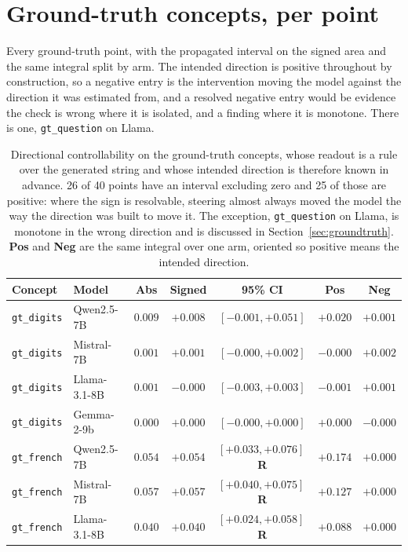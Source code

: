 \documentclass{article}
\begin{document}
\section{Ground-truth concepts, per point}
\label{app:groundtruth}

Every ground-truth point, with the propagated interval on the signed area
and the same integral split by arm. The intended direction is positive
throughout by construction, so a negative entry is the intervention moving
the model against the direction it was estimated from, and a resolved
negative entry would be evidence the check is wrong where it is isolated, and
a finding where it is monotone. There is one, \texttt{gt\_question} on Llama.

\begin{table}[htbp]
  \caption{Directional controllability on the ground-truth concepts,
  whose readout is a rule over the generated string and whose intended
  direction is therefore known in advance. 26 of 40 points have an interval
  excluding zero and 25 of those are positive: where the sign is resolvable,
  steering almost always moved the model the way the direction was built to move
  it. The exception, \texttt{gt\_question} on Llama, is monotone in the wrong
  direction and is discussed in Section~\ref{sec:groundtruth}. \textbf{Pos} and \textbf{Neg} are the same integral over one arm,
  oriented so positive means the intended direction.}
  \label{tab:groundtruth}
  \centering
  \footnotesize
  \begin{tabular}{llccccc}
    \toprule
    Concept & Model & Abs & Signed & 95\% CI & Pos & Neg \\
    \midrule
    \texttt{gt\_digits} & Qwen2.5-7B & $0.009$ & $+0.008$ & $[-0.001, +0.051]$ & $+0.020$ & $+0.001$ \\
    \texttt{gt\_digits} & Mistral-7B & $0.001$ & $+0.001$ & $[-0.000, +0.002]$ & $-0.000$ & $+0.002$ \\
    \texttt{gt\_digits} & Llama-3.1-8B & $0.001$ & $-0.000$ & $[-0.003, +0.003]$ & $-0.001$ & $+0.001$ \\
    \texttt{gt\_digits} & Gemma-2-9b & $0.000$ & $+0.000$ & $[-0.000, +0.000]$ & $+0.000$ & $-0.000$ \\
    \texttt{gt\_french} & Qwen2.5-7B & $0.054$ & $+0.054$ & $[+0.033, +0.076]$\,\textbf{R} & $+0.174$ & $+0.000$ \\
    \texttt{gt\_french} & Mistral-7B & $0.057$ & $+0.057$ & $[+0.040, +0.075]$\,\textbf{R} & $+0.127$ & $+0.000$ \\
    \texttt{gt\_french} & Llama-3.1-8B & $0.040$ & $+0.040$ & $[+0.024, +0.058]$\,\textbf{R} & $+0.088$ & $+0.000$ \\

\end{tabular}
\end{table}
\end{document}
